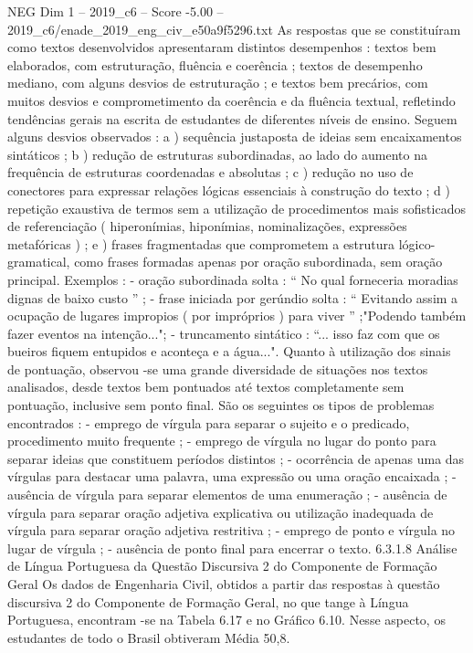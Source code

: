 \begin{textsample}{NEG Dim 1 – 2019\_c6 – Score -5.00 – 2019\_c6/enade\_2019\_eng\_civ\_e50a9f5296.txt}
As respostas que se constituíram como textos desenvolvidos apresentaram distintos desempenhos : textos bem elaborados, com estruturação, fluência e coerência ; textos de desempenho mediano, com alguns desvios de estruturação ; e textos bem precários, com muitos desvios e comprometimento da coerência e da fluência textual, refletindo tendências gerais na escrita de estudantes de diferentes níveis de ensino.
Seguem alguns desvios observados : a ) sequência justaposta de ideias sem encaixamentos sintáticos ; b ) redução de estruturas subordinadas, ao lado do aumento na frequência de estruturas coordenadas e absolutas ; c ) redução no uso de conectores para expressar relações lógicas essenciais à construção do texto ; d ) repetição exaustiva de termos sem a utilização de procedimentos mais sofisticados de referenciação ( hiperonímias, hiponímias, nominalizações, expressões metafóricas ) ; e ) frases fragmentadas que comprometem a estrutura lógico-gramatical, como frases formadas apenas por oração subordinada, sem oração principal.
Exemplos : - oração subordinada solta : “ No qual forneceria moradias dignas de baixo custo ” ; - frase iniciada por gerúndio solta : “ Evitando assim a ocupação de lugares impropios ( por impróprios ) para viver ” ;"Podendo também fazer eventos na intenção..."; - truncamento sintático : “... isso faz com que os bueiros fiquem entupidos e aconteça e a água...".
Quanto à utilização dos sinais de pontuação, observou -se uma grande diversidade de situações nos textos analisados, desde textos bem pontuados até textos completamente sem pontuação, inclusive sem ponto final.
São os seguintes os tipos de problemas encontrados : - emprego de vírgula para separar o sujeito e o predicado, procedimento muito frequente ; - emprego de vírgula no lugar do ponto para separar ideias que constituem períodos distintos ; - ocorrência de apenas uma das vírgulas para destacar uma palavra, uma expressão ou uma oração encaixada ; - ausência de vírgula para separar elementos de uma enumeração ; - ausência de vírgula para separar oração adjetiva explicativa ou utilização inadequada de vírgula para separar oração adjetiva restritiva ; - emprego de ponto e vírgula no lugar de vírgula ; - ausência de ponto final para encerrar o texto. 6.3.1.8 Análise de Língua Portuguesa da Questão Discursiva 2 do Componente de Formação Geral Os dados de Engenharia Civil, obtidos a partir das respostas à questão discursiva 2 do Componente de Formação Geral, no que tange à Língua Portuguesa, encontram -se na Tabela 6.17 e no Gráfico 6.10.
Nesse aspecto, os estudantes de todo o Brasil obtiveram Média 50,8.

\end{textsample}
